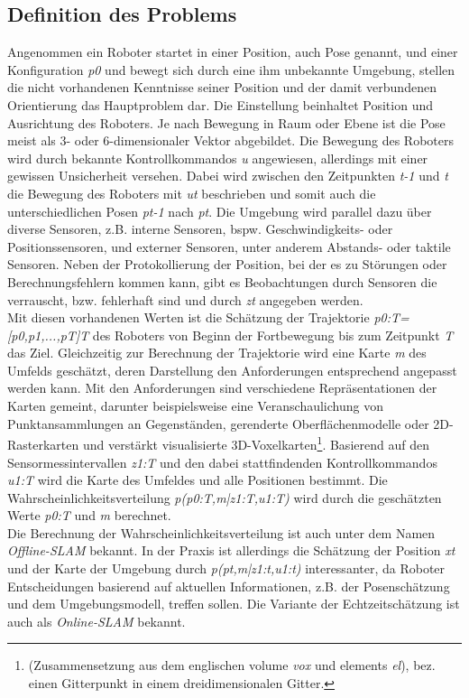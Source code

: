 \subsection{Definition des Problems}
Angenommen ein Roboter startet in einer Position, auch Pose genannt, und einer Konfiguration \textit{p0} und bewegt sich durch eine ihm 
unbekannte Umgebung, stellen die nicht vorhandenen Kenntnisse seiner Position und der damit verbundenen Orientierung das Hauptproblem dar. 
Die Einstellung beinhaltet Position und Ausrichtung des Roboters. Je nach Bewegung in Raum oder Ebene ist die Pose meist als 3- oder 
6-dimensionaler Vektor abgebildet. Die Bewegung des 
Roboters wird durch bekannte Kontrollkommandos \textit{u} angewiesen, allerdings mit einer gewissen Unsicherheit versehen. Dabei wird 
zwischen den Zeitpunkten \textit{t-1} und \textit{t} die Bewegung des Roboters mit \textit{ut} beschrieben und somit auch die 
unterschiedlichen Posen \textit{pt-1} nach \textit{pt}. Die Umgebung wird parallel dazu über diverse Sensoren, z.B. interne Sensoren, bspw. 
Geschwindigkeits- oder Positionssensoren, und externer Sensoren, unter anderem Abstands- oder taktile Sensoren. Neben der Protokollierung der 
Position, bei der es zu Störungen oder Berechnungsfehlern kommen kann, gibt es Beobachtungen durch Sensoren die verrauscht, bzw. fehlerhaft 
sind und durch \textit{zt} angegeben werden.
\\ 
\linebreak
Mit diesen vorhandenen Werten ist die Schätzung der Trajektorie \textit{p0:T=[p0,p1,...,pT]T} des Roboters von Beginn der 
Fortbewegung bis zum Zeitpunkt \textit{T} das Ziel. Gleichzeitig zur Berechnung der Trajektorie wird eine Karte \textit{m} des Umfelds geschätzt, 
deren Darstellung den Anforderungen entsprechend angepasst werden kann. Mit den Anforderungen sind verschiedene Repräsentationen der Karten 
gemeint, darunter beispielsweise eine Veranschaulichung von Punktansammlungen an Gegenständen, gerenderte Oberflächenmodelle oder 
2D-Rasterkarten und verstärkt visualisierte 3D-Voxelkarten\footnote{(Zusammensetzung aus dem englischen volume \textit{vox} und elements 
\textit{el}), bez. einen Gitterpunkt in einem dreidimensionalen Gitter.}. Basierend auf den Sensormessintervallen \textit{z1:T} und den dabei
stattfindenden Kontrollkommandos \textit{u1:T} wird die Karte des Umfeldes und alle Positionen bestimmt. Die Wahrscheinlichkeitsverteilung 
\textit{p(p0:T,m|z1:T,u1:T)} wird durch die geschätzten Werte \textit{p0:T} und \textit{m} berechnet. 
\\ 
\linebreak
Die Berechnung der Wahrscheinlichkeitsverteilung ist auch unter dem Namen \textit{Offline-\acs{SLAM}} bekannt. In der Praxis ist allerdings 
die Schätzung der Position \textit{xt} und der Karte der Umgebung durch \textit{p(pt,m|z1:t,u1:t)} interessanter, da Roboter Entscheidungen 
basierend auf aktuellen Informationen, z.B. der Posenschätzung und dem Umgebungsmodell, treffen sollen. Die Variante der Echtzeitschätzung 
ist auch als \textit{Online-SLAM} bekannt. \cite{slamdefi.2016a}

